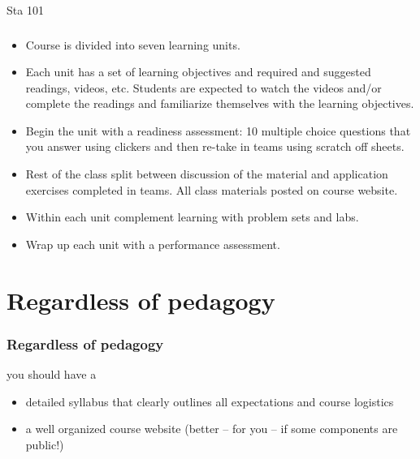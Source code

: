 \documentclass{beamer}
\begin{document}
\begin{frame}{Sta 101}
\frametitle{}

\begin{itemize}

\item Course is divided into seven learning units. 

\item Each unit has a set of learning objectives and required and suggested readings, videos, etc. Students are expected to watch the videos and/or complete the readings and familiarize themselves with the learning objectives. 

\item Begin the unit with a readiness assessment: 10 multiple choice questions that you answer using clickers and then re-take in teams using scratch off sheets.

\item Rest of the class split between discussion of the material and application exercises completed in teams. All class materials posted on course website.

\item Within each unit complement learning with problem sets and labs.

\item Wrap up each unit with a performance assessment.

\end{itemize}

\end{frame}


\section{Regardless of pedagogy}


\begin{frame}
\frametitle{Regardless of pedagogy}

you should have a

\begin{itemize}

\item detailed syllabus that clearly outlines all expectations and course logistics

\item a well organized course website (better -- for you -- if some components are public!) 

\end{itemize}

\end{frame}
\end{document}

